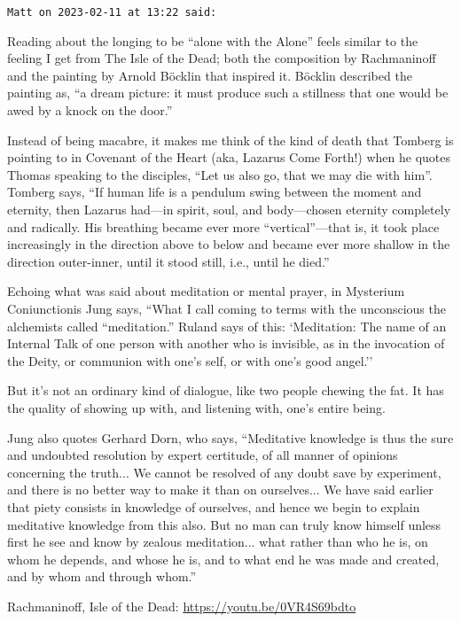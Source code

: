 \begin{footnotesize}
\begin{sffamily}
\hfill

\texttt{Matt on 2023-02-11 at 13:22 said:}

Reading about the longing to be ``alone with the Alone'' feels similar to the feeling I get from The Isle of the Dead; both the composition by Rachmaninoff and the painting by Arnold Böcklin that inspired it. Böcklin described the painting as, ``a dream picture: it must produce such a stillness that one would be awed by a knock on the door.''

Instead of being macabre, it makes me think of the kind of death that Tomberg is pointing to in Covenant of the Heart (aka, Lazarus Come Forth!) when he quotes Thomas speaking to the disciples, ``Let us also go, that we may die with him''. Tomberg says, ``If human life is a pendulum swing between the moment and eternity, then Lazarus had---in spirit, soul, and body---chosen eternity completely and radically. His breathing became ever more ``vertical''---that is, it took place increasingly in the direction above to below and became ever more shallow in the direction outer-inner, until it stood still, i.e., until he died.''

Echoing what was said about meditation or mental prayer, in Mysterium Coniunctionis Jung says, ``What I call coming to terms with the unconscious the alchemists called ``meditation.'' Ruland says of this: `Meditation: The name of an Internal Talk of one person with another who is invisible, as in the invocation of the Deity, or communion with one's self, or with one's good angel.\textquotesingle''

But it's not an ordinary kind of dialogue, like two people chewing the fat. It has the quality of showing up with, and listening with, one's entire being.

Jung also quotes Gerhard Dorn, who says, ``Meditative knowledge is thus the sure and undoubted resolution by expert certitude, of all manner of opinions concerning the truth... We cannot be resolved of any doubt save by experiment, and there is no better way to make it than on ourselves... We have said earlier that piety consists in knowledge of ourselves, and hence we begin to explain meditative knowledge from this also. But no man can truly know himself unless first he see and know by zealous meditation... what rather than who he is, on whom he depends, and whose he is, and to what end he was made and created, and by whom and through whom.''

Rachmaninoff, Isle of the Dead: \url{https://youtu.be/0VR4S69bdto}

\hfill

\end{sffamily}
\end{footnotesize}

